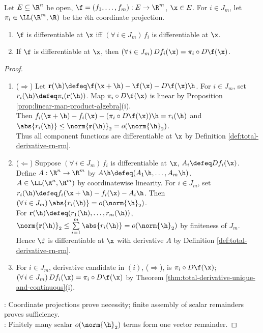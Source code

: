 \begin{theorem} \label{thm:several-variable-componentwise-differentiability} \\
Let $E\subseteq\R^n$ be open, $\f=(f_1,\ldots,f_m):E\to\R^m$, $\x\in E$. For $i\in J_m$, let $\pi_i\in\LL(\R^m,\R)$ be the $i$th coordinate projection.
\begin{enumerate}[label=(\roman*)]
\setlength{\itemsep}{0pt}
\item $\f$ is differentiable at $\x$ iff $(\forall\,i\in J_m)\,f_i$ is differentiable at $\x$.
\item If $\f$ is differentiable at $\x$, then $(\forall\,i\in J_m)\,D f_i(\x)=\pi_i\circ D\f(\x)$.
\end{enumerate}
\begin{proof}
\begin{enumerate}[label=(\roman*)]
\setlength{\itemsep}{0pt}
\item[$(i)$] ($\Rightarrow$) Let $\mathbf r(\h)\defeq\f(\x+\h)-\f(\x)-D\f(\x)\h$. For $i\in J_m$, set $r_i(\h)\defeq\pi_i(\mathbf r(\h))$. Map $\pi_i\circ D\f(\x)$ is linear by Proposition \ref{prop:linear-map-product-algebra}(i).\\
Then $f_i(\x+\h)-f_i(\x)-(\pi_i\circ D\f(\x))\h=r_i(\h)$ and $\abs{r_i(\h)}\leq\norm{\mathbf r(\h)}_2=o(\norm{\h}_2)$.\\
Thus all component functions are differentiable at $\x$ by Definition \ref{def:total-derivative-rn-rm}.
\item[$(i)$] ($\Leftarrow$) Suppose $(\forall\,i\in J_m)\,f_i$ is differentiable at $\x$,   $A_i\defeq D f_i(\x)$. Define $A:\R^n\to\R^m$ by $A\h\defeq(A_1\h,\ldots,A_m\h)$.\\
$A\in\LL(\R^n,\R^m)$ by coordinatewise linearity. For $i\in J_m$, set $r_i(\h)\defeq f_i(\x+\h)-f_i(\x)-A_i\h$. Then $(\forall\,i\in J_m)\,\abs{r_i(\h)}=o(\norm{\h}_2)$.\\
For $\mathbf r(\h)\defeq(r_1(\h),\ldots,r_m(\h))$, $\norm{\mathbf r(\h)}_2\leq\sum\limits_{i=1}^{m}\abs{r_i(\h)}=o(\norm{\h}_2)$ by finiteness of $J_m$.\\
Hence $\f$ is differentiable at $\x$ with derivative $A$ by Definition \ref{def:total-derivative-rn-rm}.
\item[$(ii)$] For $i\in J_m$, derivative candidate in $(i)$, ($\Rightarrow$), is $\pi_i\circ D\f(\x)$; $(\forall\,i\in J_m)\,D f_i(\x)=\pi_i\circ D\f(\x)$ by Theorem \ref{thm:total-derivative-unique-and-continuous}(i).
\end{enumerate}
: Coordinate projections prove necessity; finite assembly of scalar remainders proves sufficiency.\\
: Finitely many scalar $o(\norm{\h}_2)$ terms form one vector remainder.
\end{proof}
\end{theorem}

